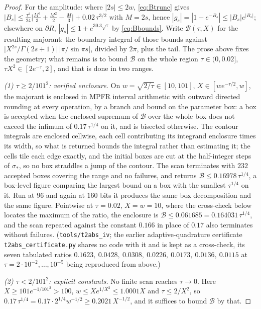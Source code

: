 \documentclass[11pt]{article}
\theoremstyle{plain}
\theoremstyle{definition}
\theoremstyle{remark}
\begin{document}
\begin{proof}
For the amplitude: where $|2s|\le2w$, \eqref{eq:Btrunc} gives
$|B_s|\le\tfrac{\tau^2}{24}\bigl|\tfrac{M^3}3+\tfrac{M^2}2-\tfrac M3\bigr|+0.02\,\tau^{3/2}$ with
$M=2s$, hence $|g_s|=|1-e^{-B_s}|\le|B_s|e^{|B_s|}$; elsewhere on $\partial R$,
$|g_s|\le1+e^{30.3\sqrt\tau}$ by \eqref{eq:Bbounds}. Write $\mathcal B(\tau,X)$ for the resulting
majorant: the boundary integral of those bounds against
$\bigl|X^{2s}/\Gamma(2s{+}1)\bigr|\,\bigl|\pi/\sin\pi s\bigr|$, divided by $2\pi$, plus the tail.
The prose above fixes the geometry; what remains is to bound $\mathcal B$ on the whole region
$\tau\in(0,0.02]$, $\tau X^2\in[2e^{-\tau},2]$, and that is done in two ranges.

\emph{(1) $\tau\ge2/101^2$: verified enclosure.} On $w=\sqrt{2/\tau}\in[10,101]$,
$X\in[we^{-\tau/2},w]$, the majorant is enclosed in MPFR interval arithmetic with outward directed
rounding at every operation, by a branch and bound on the parameter box: a box is accepted when the
enclosed supremum of $\mathcal B$ over the whole box does not exceed the infimum of
$0.17\,\tau^{1/4}$ on it, and is bisected otherwise. The contour integrals are enclosed cellwise,
each cell contributing its integrand enclosure times its width, so what is returned bounds the
integral rather than estimating it; the cells tile each edge exactly, and the initial boxes are cut
at the half-integer steps of $\sigma_\ast$, so no box straddles a jump of the contour. The scan
terminates with $232$ accepted boxes covering the range and no failures, and returns
$\mathcal B\le0.16978\,\tau^{1/4}$, a box-level figure comparing the largest bound on a box with
the smallest $\tau^{1/4}$ on it. Run at $96$ and again at $160$ bits it produces the same box
decomposition and the same figure. Pointwise at $\tau=0.02$, $X=w=10$, where the cross-check below locates the maximum of the ratio,
the enclosure is $\mathcal B\le0.061685=0.164031\,\tau^{1/4}$, and the scan repeated against the constant $0.166$ in
place of $0.17$ also terminates without failures. (\texttt{tools/t2abs\_iv}; the earlier
adaptive-quadrature certificate \texttt{t2abs\_certificate.py} shares no code with it and is kept as
a cross-check, its seven tabulated ratios $0.1623,\ 0.0428,\ 0.0308,\ 0.0226,\ 0.0173,\ 0.0136,\
0.0115$ at $\tau=2\cdot10^{-2},\dots,10^{-5}$ being reproduced from above.)

\emph{(2) $\tau<2/101^2$: explicit constants.} No finite scan reaches $\tau\to0$. Here
$X\ge101e^{-1/101^2}>100$, $w\le Xe^{1/X^2}\le1.0001X$ and $\tau\le2/X^2$, so
$0.17\,\tau^{1/4}=0.17\cdot2^{1/4}w^{-1/2}\ge0.2021\,X^{-1/2}$, and it suffices to bound
$\mathcal B$ by that.


\end{proof}
\end{document}
